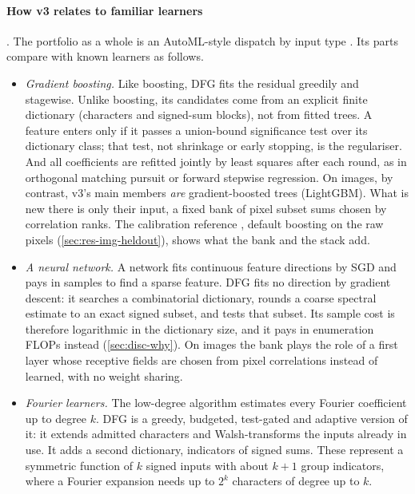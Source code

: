 \paragraph{How v3 relates to familiar learners}\label{sec:relates} . The portfolio as a whole is an AutoML-style dispatch by input type \cite{discretelearners2026}. Its parts compare with known learners as follows.
\begin{itemize}
\item \emph{Gradient boosting.} Like boosting, DFG fits the residual greedily and stagewise. Unlike boosting, its candidates come from an explicit finite dictionary (characters and signed-sum blocks), not from fitted trees. A feature enters only if it passes a union-bound significance test over its dictionary class; that test, not shrinkage or early stopping, is the regulariser. And all coefficients are refitted jointly by least squares after each round, as in orthogonal matching pursuit or forward stepwise regression. On images, by contrast, v3's main members \emph{are} gradient-boosted trees (LightGBM). What is new there is only their input, a fixed bank of pixel subset sums chosen by correlation ranks. The calibration reference , default boosting on the raw pixels (\cref{sec:res-img-heldout}), shows what the bank and the stack add.
\item \emph{A neural network.} A network fits continuous feature directions by SGD and pays in samples to find a sparse feature. DFG fits no direction by gradient descent: it searches a combinatorial dictionary, rounds a coarse spectral estimate to an exact signed subset, and tests that subset. Its sample cost is therefore logarithmic in the dictionary size, and it pays in enumeration FLOPs instead (\cref{sec:disc-why}). On images the bank plays the role of a first layer whose receptive fields are chosen from pixel correlations instead of learned, with no weight sharing.
\item \emph{Fourier learners.} The low-degree algorithm \cite{linial1993constant} estimates every Fourier coefficient up to degree $k$. DFG is a greedy, budgeted, test-gated and adaptive version of it: it extends admitted characters and Walsh-transforms the inputs already in use. It adds a second dictionary, indicators of signed sums. These represent a symmetric function of $k$ signed inputs with about $k+1$ group indicators, where a Fourier expansion needs up to $2^k$ characters of degree up to $k$.
\end{itemize}

